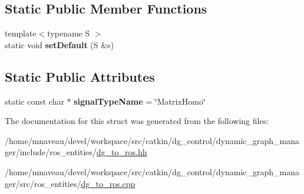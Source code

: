 \subsection*{Static Public Member Functions}
\begin{DoxyCompactItemize}
\item 
{\footnotesize template$<$typename S $>$ }\\static void {\bfseries set\+Default} (S \&s)\hypertarget{structdynamic__graph_1_1DgToRos_3_01std_1_1pair_3_01MatrixHomogeneous_00_01Vector_01_4_01_4_ab5d21c1a813043c42b1444084d2001b5}{}\label{structdynamic__graph_1_1DgToRos_3_01std_1_1pair_3_01MatrixHomogeneous_00_01Vector_01_4_01_4_ab5d21c1a813043c42b1444084d2001b5}

\end{DoxyCompactItemize}
\subsection*{Static Public Attributes}
\begin{DoxyCompactItemize}
\item 
static const char $\ast$ {\bfseries signal\+Type\+Name} = \char`\"{}Matrix\+Homo\char`\"{}\hypertarget{structdynamic__graph_1_1DgToRos_3_01std_1_1pair_3_01MatrixHomogeneous_00_01Vector_01_4_01_4_a1d5bcd8801ebb4c87d4870ed195f01c2}{}\label{structdynamic__graph_1_1DgToRos_3_01std_1_1pair_3_01MatrixHomogeneous_00_01Vector_01_4_01_4_a1d5bcd8801ebb4c87d4870ed195f01c2}

\end{DoxyCompactItemize}


The documentation for this struct was generated from the following files\+:\begin{DoxyCompactItemize}
\item 
/home/mnaveau/devel/workspace/src/catkin/dg\+\_\+control/dynamic\+\_\+graph\+\_\+manager/include/ros\+\_\+entities/\hyperlink{dg__to__ros_8hh}{dg\+\_\+to\+\_\+ros.\+hh}\item 
/home/mnaveau/devel/workspace/src/catkin/dg\+\_\+control/dynamic\+\_\+graph\+\_\+manager/src/ros\+\_\+entities/\hyperlink{dg__to__ros_8cpp}{dg\+\_\+to\+\_\+ros.\+cpp}\end{DoxyCompactItemize}
